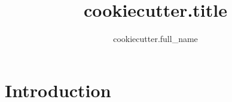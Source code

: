 \documentclass[a4paper]{scrartcl}
\title{{{cookiecutter.title}}}
\author{{cookiecutter.full_name}}
\begin{document}
\maketitle

\section{Introduction} %
\label{sec:introduction}
%

%



\end{document}
